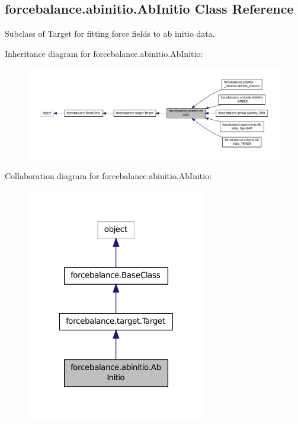 \hypertarget{classforcebalance_1_1abinitio_1_1AbInitio}{\subsection{forcebalance.\-abinitio.\-Ab\-Initio Class Reference}
\label{classforcebalance_1_1abinitio_1_1AbInitio}
}


Subclass of Target for fitting force fields to ab initio data.  




Inheritance diagram for forcebalance.\-abinitio.\-Ab\-Initio\-:
\nopagebreak
\begin{figure}[H]
\begin{center}
\leavevmode
\includegraphics[width=350pt]{classforcebalance_1_1abinitio_1_1AbInitio__inherit__graph}
\end{center}
\end{figure}


Collaboration diagram for forcebalance.\-abinitio.\-Ab\-Initio\-:
\nopagebreak
\begin{figure}[H]
\begin{center}
\leavevmode
\includegraphics[width=222pt]{classforcebalance_1_1abinitio_1_1AbInitio__coll__graph}
\end{center}
\end{figure}

